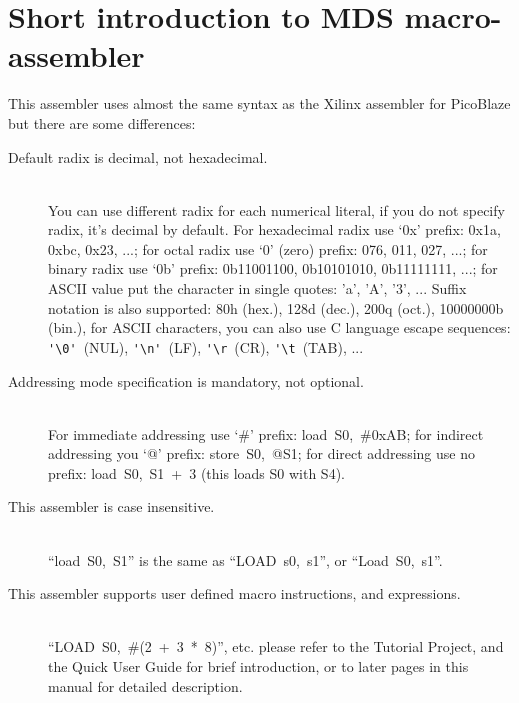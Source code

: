 \section{Short introduction to MDS macro-assembler}
    This assembler uses almost the same syntax as the Xilinx assembler for PicoBlaze but there are some differences:
    \begin{description}
        \item[Default radix is decimal, not hexadecimal.]
            ~\\You can use different radix for each numerical literal, if you do not specify radix, it's decimal by
            default. For hexadecimal radix use `0x' prefix: 0x1a, 0xbc, 0x23, ...; for octal radix use `0' (zero)
            prefix: 076, 011, 027, ...; for binary radix use `0b' prefix: 0b11001100, 0b10101010, 0b11111111, ...; for
            ASCII value put the character in single quotes: 'a', 'A', '3', ... Suffix notation is also supported: 80h
            (hex.), 128d (dec.), 200q (oct.), 10000000b (bin.), for ASCII characters, you can also use C language escape
            sequences: \verb"'\0'"~(NUL), \verb"'\n'"~(LF), \verb"'\r"~(CR), \verb"'\t"~(TAB), ...
        \item[Addressing mode specification is mandatory, not optional.]
            ~\\For immediate addressing use `\#' prefix: load~S0,~\#0xAB; for indirect addressing you `@' prefix:
            store~S0,~@S1; for direct addressing use no prefix: load~S0,~S1~+~3 (this loads S0 with S4).
        \item[This assembler is case insensitive.]
            ~\\``load~S0,~S1'' is the same as ``LOAD~s0,~s1'', or ``Load~S0,~s1''.
        \item[This assembler supports user defined macro instructions, and expressions.]
            ~\\``LOAD~S0,~\#(2~+~3~*~8)'', etc. please refer to the Tutorial Project, and the Quick User Guide for brief
            introduction, or to later pages in this manual for detailed description.
    \end{description}
